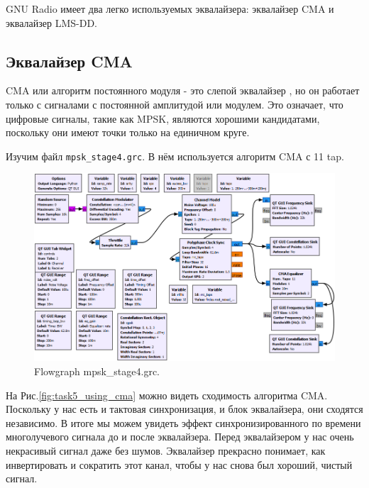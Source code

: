 \documentclass[a4paper, 14pt]{extarticle}
\begin{document}
    GNU Radio имеет два легко используемых эквалайзера: эквалайзер CMA и эквалайзер LMS-DD.

    \subsection{Эквалайзер CMA}
    \label{subsec:task5_cma}

     CMA или алгоритм постоянного модуля - это слепой эквалайзер , но он работает только с сигналами с
     постоянной амплитудой или модулем.
     Это означает, что цифровые сигналы, такие как MPSK, являются хорошими кандидатами,
     поскольку они имеют точки только на единичном круге.

     Изучим файл \texttt{mpsk\_stage4.grc}. В нём используется алгоритм CMA с 11 tap.

    \begin{figure}[h]
        \centering
        \includegraphics[width=0.9\linewidth]{resources/Images/task5_mpsk_stage4}
        \caption{Flowgraph mpsk\_stage4.grc.}
        \label{fig:task5_mpsk_stage4}
    \end{figure}

    На Рис.\ref{fig:task5_using_cma} можно видеть сходимость алгоритма CMA.
    Поскольку у нас есть и тактовая синхронизация, и блок эквалайзера, они сходятся независимо.
    В итоге мы можем увидеть эффект синхронизированного по времени многолучевого сигнала до и
    после эквалайзера.
    Перед эквалайзером у нас очень некрасивый сигнал даже без шумов.
    Эквалайзер прекрасно понимает, как инвертировать и сократить этот канал, чтобы у нас снова был хороший,
    чистый сигнал.
\end{document}

